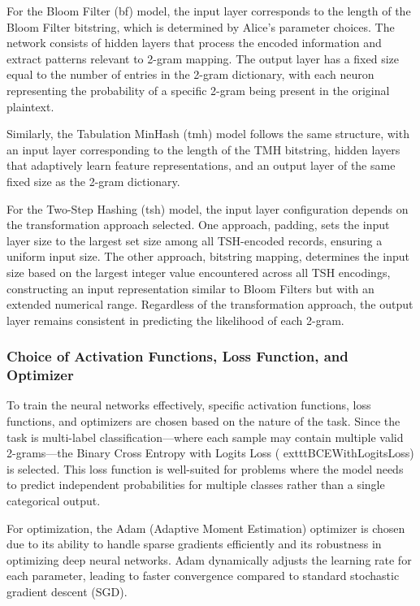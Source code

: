 For the Bloom Filter (\ac{bf}) model, the input layer corresponds to the length of the Bloom Filter bitstring, which is determined by Alice’s parameter choices. The network consists of hidden layers that process the encoded information and extract patterns relevant to 2-gram mapping. The output layer has a fixed size equal to the number of entries in the 2-gram dictionary, with each neuron representing the probability of a specific 2-gram being present in the original plaintext.

Similarly, the Tabulation MinHash (\ac{tmh}) model follows the same structure, with an input layer corresponding to the length of the TMH bitstring, hidden layers that adaptively learn feature representations, and an output layer of the same fixed size as the 2-gram dictionary.

For the Two-Step Hashing (\ac{tsh}) model, the input layer configuration depends on the transformation approach selected. One approach, padding, sets the input layer size to the largest set size among all TSH-encoded records, ensuring a uniform input size. The other approach, bitstring mapping, determines the input size based on the largest integer value encountered across all TSH encodings, constructing an input representation similar to Bloom Filters but with an extended numerical range. Regardless of the transformation approach, the output layer remains consistent in predicting the likelihood of each 2-gram.

\subsubsection{Choice of Activation Functions, Loss Function, and Optimizer}

To train the neural networks effectively, specific activation functions, loss functions, and optimizers are chosen based on the nature of the task. Since the task is multi-label classification—where each sample may contain multiple valid 2-grams—the Binary Cross Entropy with Logits Loss (	exttt{BCEWithLogitsLoss}) is selected. This loss function is well-suited for problems where the model needs to predict independent probabilities for multiple classes rather than a single categorical output.

For optimization, the Adam (Adaptive Moment Estimation) optimizer is chosen due to its ability to handle sparse gradients efficiently and its robustness in optimizing deep neural networks. Adam dynamically adjusts the learning rate for each parameter, leading to faster convergence compared to standard stochastic gradient descent (SGD).


